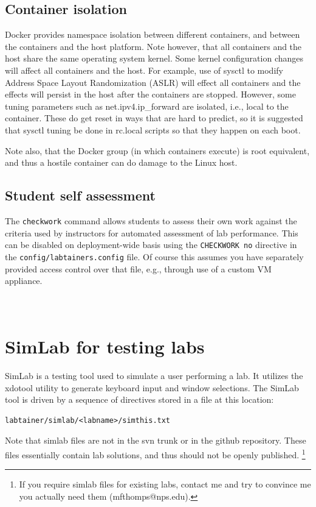 \documentclass[12pt]{article}
\begin{document}
\subsection {Container isolation}
Docker provides namespace isolation between different containers, and
between the containers and the host platform.  Note however, that all
containers and the host share the same operating system kernel.  Some
kernel configuration changes will affect all containers and the host.  For example,
use of sysctl to modify Address Space Layout Randomization (ASLR) will effect
all containers and the effects will persist in the host after the containers
are stopped.  However, some tuning parameters such as net.ipv4.ip\_forward are
isolated, i.e., local to the container. These do get reset in ways that are
hard to predict, so it is suggested that sysctl tuning be done in rc.local
scripts so that they happen on each boot.

Note also, that the Docker group (in which containers execute) is root 
equivalent, and thus a hostile container can do damage to the Linux host.

\subsection {Student self assessment}
The {\tt checkwork} command allows students to assess their own work against
the criteria used by instructors for automated assessment of lab performance.
This can be disabled on deployment-wide basis using the {\tt CHECKWORK no} directive
in the {\tt config/labtainers.config} file.  Of course this assumes you have separately
provided access control over that file, e.g., through use of a custom VM appliance.

\newpage
\appendix
\section{\\SimLab for testing labs}
\label{testing}
SimLab is a testing tool used to simulate a user performing a lab.  
It utilizes the xdotool utility to
generate keyboard input and window selections.  The SimLab tool is driven by a 
sequence of directives stored in a file at this location:
\begin{verbatim}
labtainer/simlab/<labname>/simthis.txt
\end{verbatim}
Note that simlab files are not in the svn trunk or in the github repository.  These
files essentially contain lab solutions, and thus should not be openly published.
\footnote{If you require simlab files for existing labs, contact me and try to convince
me you actually need them (mfthomps@nps.edu).}
\end{document}
